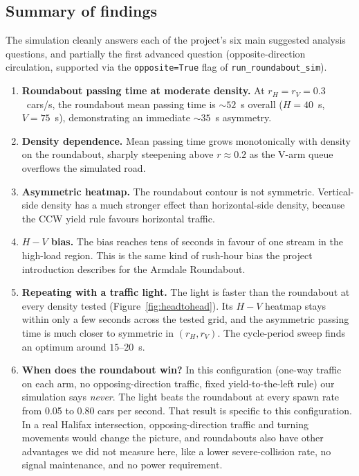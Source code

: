 \documentclass[11pt]{article}
\begin{document}
\subsection{Summary of findings}
The simulation cleanly answers each of the project's six main suggested analysis questions, and partially the first advanced question (opposite-direction circulation, supported via the \texttt{opposite=True} flag of \texttt{run\_roundabout\_sim}).
\begin{enumerate}
    \item \textbf{Roundabout passing time at moderate density.} At $r_H = r_V = 0.3$~cars/s, the roundabout mean passing time is $\sim 52$~s overall ($H = 40$~s, $V = 75$~s), demonstrating an immediate $\sim 35$~s asymmetry.
    \item \textbf{Density dependence.} Mean passing time grows monotonically with density on the roundabout, sharply steepening above $r \approx 0.2$ as the V-arm queue overflows the simulated road.
    \item \textbf{Asymmetric heatmap.} The roundabout contour is not symmetric. Vertical-side density has a much stronger effect than horizontal-side density, because the CCW yield rule favours horizontal traffic.
    \item \textbf{$H - V$ bias.} The bias reaches tens of seconds in favour of one stream in the high-load region. This is the same kind of rush-hour bias the project introduction describes for the Armdale Roundabout.
    \item \textbf{Repeating with a traffic light.} The light is faster than the roundabout at every density tested (Figure~\ref{fig:headtohead}). Its $H - V$ heatmap stays within only a few seconds across the tested grid, and the asymmetric passing time is much closer to symmetric in $(r_H, r_V)$. The cycle-period sweep finds an optimum around $15$--$20$~s.
    \item \textbf{When does the roundabout win?} In this configuration (one-way traffic on each arm, no opposing-direction traffic, fixed yield-to-the-left rule) our simulation says \emph{never}. The light beats the roundabout at every spawn rate from 0.05 to 0.80 cars per second. That result is specific to this configuration. In a real Halifax intersection, opposing-direction traffic and turning movements would change the picture, and roundabouts also have other advantages we did not measure here, like a lower severe-collision rate, no signal maintenance, and no power requirement.
\end{enumerate}
\end{document}
